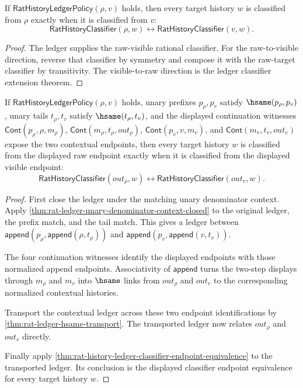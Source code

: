 \begin{theorem}
\label{thm:rat-history-ledger-classifier-endpoint-equivalence}
If $\mathsf{RatHistoryLedgerPolicy}(\rho,v)$ holds, then every target history
$w$ is classified from $\rho$ exactly when it is classified from $v$:
$$
\mathsf{RatHistoryClassifier}(\rho,w)\leftrightarrow
\mathsf{RatHistoryClassifier}(v,w).
$$
\end{theorem}
\begin{proof}
The ledger supplies the raw-visible rational classifier. For the raw-to-visible
direction, reverse that classifier by symmetry and compose it with the
raw-target classifier by transitivity. The visible-to-raw direction is the
ledger classifier extension theorem.
\end{proof}

\begin{theorem}
\label{thm:rat-history-ledger-cont-unary-context-classifier-endpoint-equivalence}
If $\mathsf{RatHistoryLedgerPolicy}(\rho,v)$ holds, unary prefixes
$p_\rho,p_v$ satisfy $\hsame(p_\rho,p_v)$, unary tails $t_\rho,t_v$ satisfy
$\hsame(t_\rho,t_v)$, and the displayed continuation witnesses
$\mathsf{Cont}(p_\rho,\rho,m_\rho)$,
$\mathsf{Cont}(m_\rho,t_\rho,out_\rho)$,
$\mathsf{Cont}(p_v,v,m_v)$, and
$\mathsf{Cont}(m_v,t_v,out_v)$ expose the two contextual endpoints, then
every target history $w$ is classified from the displayed raw endpoint exactly
when it is classified from the displayed visible endpoint:
$$
\mathsf{RatHistoryClassifier}(out_\rho,w)\leftrightarrow
\mathsf{RatHistoryClassifier}(out_v,w).
$$
\end{theorem}
\begin{proof}
First close the ledger under the matching unary denominator context. Apply
\autoref{thm:rat-ledger-unary-denominator-context-closed} to the original
ledger, the prefix match, and the tail match. This gives a ledger between
$\mathsf{append}(p_\rho,\mathsf{append}(\rho,t_\rho))$ and
$\mathsf{append}(p_v,\mathsf{append}(v,t_v))$.

The four continuation witnesses identify the displayed endpoints with those
normalized append endpoints. Associativity of $\mathsf{append}$ turns the
two-step displays through $m_\rho$ and $m_v$ into $\hsame$ links from
$out_\rho$ and $out_v$ to the corresponding normalized contextual histories.

Transport the contextual ledger across these two endpoint identifications by
\autoref{thm:rat-ledger-hsame-transport}. The transported ledger now relates
$out_\rho$ and $out_v$ directly.

Finally apply
\autoref{thm:rat-history-ledger-classifier-endpoint-equivalence} to the
transported ledger. Its conclusion is the displayed classifier endpoint
equivalence for every target history $w$.
\end{proof}


